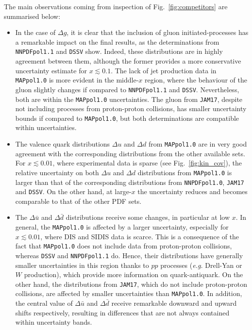 The main observations coming from inspection of Fig.~\ref{fig:competitors} are summarised below:
\begin{itemize}
  \item In the case of $\Delta g$, it is clear that the inclusion of gluon initiated-processes has a remarkable impact on the final results, as the determinations from \texttt{NNPDFpol1.1} and \texttt{DSSV} show. Indeed, these distributions are in highly agreement between them, although the former provides a more conservative uncertainty estimate for $x \lesssim 0.1$. The lack of jet production data in \texttt{MAPpol1.0} is more evident in the middle-$x$ region, where the behaviour of the gluon slightly changes if compared to \texttt{NNPDFpol1.1} and \texttt{DSSV}. Nevertheless, both are within the \texttt{MAPpol1.0} uncertainties. The gluon from \texttt{JAM17}, despite not including processes from proton-proton collisions, has smaller uncertainty bounds if compared to \texttt{MAPpol1.0}, but both determinations are compatible within uncertainties.
  \item The valence quark distributions $\Delta u$ and $\Delta d$ from \texttt{MAPpol1.0} are in very good agreement with the corresponding distributions from the other available sets. For $x \lesssim 0.01$, where experimental data is sparse (see Fig.~\ref{fig:kin_cov}), the relative uncertainty on both $\Delta u$ and $\Delta d$ distributions from \texttt{MAPpol1.0} is larger than that of the corresponding distributions from \texttt{NNPDFpol1.0}, \texttt{JAM17} and \texttt{DSSV}. On the other hand, at large-$x$ the uncertainty reduces and becomes comparable to that of the other PDF sets.
  \item The $\Delta \bar{u}$ and $\Delta \bar{d}$ distributions receive some changes, in particular at low $x$. In general, the \texttt{MAPpol1.0} is affected by a larger uncertainty, especially for $x \lesssim 0.01$, where DIS and SIDIS data is scarce. This is a consequence of the fact that \texttt{MAPpol1.0} does not include data from proton-proton collisions, whereas \texttt{DSSV} and \texttt{NNPDFpol1.1} do. Hence, their distributions have generally smaller uncertainties in this region thanks to $pp$ processes (\textit{e.g.} Drell-Yan or $W$ production), which provide more information on quark-antiquark. On the other hand, the distributions from \texttt{JAM17}, which do not include proton-proton collisions, are affected by smaller uncertainties than \texttt{MAPpol1.0}. In addition, the central value of $\Delta \bar{u}$ and $\Delta \bar{d}$ receive remarkable downward and upward shifts respectively, resulting in differences that are not always contained within uncertainty bands.

\end{itemize}
